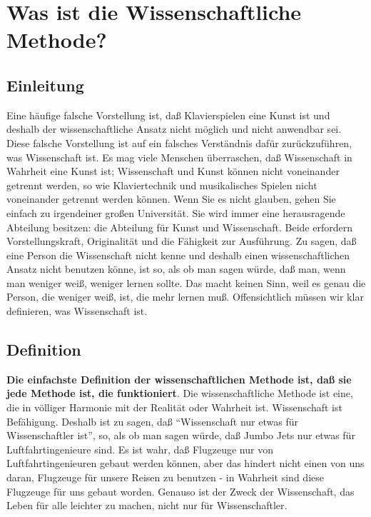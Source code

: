 
\section{Was ist die Wissenschaftliche Methode?}
\label{c3_3}

\subsection{Einleitung}
\label{c3_3a}

Eine häufige falsche Vorstellung ist, daß Klavierspielen eine Kunst ist und deshalb der wissenschaftliche Ansatz nicht möglich und nicht anwendbar sei.
Diese falsche Vorstellung ist auf ein falsches Verständnis dafür zurückzuführen, was Wissenschaft ist.
Es mag viele Menschen überraschen, daß Wissenschaft in Wahrheit eine Kunst ist; Wissenschaft und Kunst können nicht voneinander getrennt werden, so wie Klaviertechnik und musikalisches Spielen nicht voneinander getrennt werden können.
Wenn Sie es nicht glauben, gehen Sie einfach zu irgendeiner großen Universität.
Sie wird immer eine herausragende Abteilung besitzen: die Abteilung für Kunst und Wissenschaft.
Beide erfordern Vorstellungskraft, Originalität und die Fähigkeit zur Ausführung.
Zu sagen, daß eine Person die Wissenschaft nicht kenne und deshalb einen wissenschaftlichen Ansatz nicht benutzen könne, ist so, als ob man sagen würde, daß man, wenn man weniger weiß, weniger lernen sollte.
Das macht keinen Sinn, weil es genau die Person, die weniger weiß, ist, die mehr lernen muß.
Offensichtlich müssen wir klar definieren, was Wissenschaft ist.


\subsection{Definition}
\label{c3_3b}

\textbf{Die einfachste Definition der wissenschaftlichen Methode ist, daß sie jede Methode ist, die funktioniert}.
Die wissenschaftliche Methode ist eine, die in völliger Harmonie mit der Realität oder Wahrheit ist.
Wissenschaft ist Befähigung.
Deshalb ist zu sagen, daß \enquote{Wissenschaft nur etwas für Wissenschaftler ist}, so, als ob man sagen würde, daß Jumbo Jets nur etwas für Luftfahrtingenieure sind.
Es ist wahr, daß  Flugzeuge nur von Luftfahrtingenieuren gebaut werden können, aber das hindert nicht einen von uns daran, Flugzeuge für unsere Reisen zu benutzen - in Wahrheit sind diese Flugzeuge für uns gebaut worden.
Genauso ist der Zweck der Wissenschaft, das Leben für alle leichter zu machen, nicht nur für Wissenschaftler.

